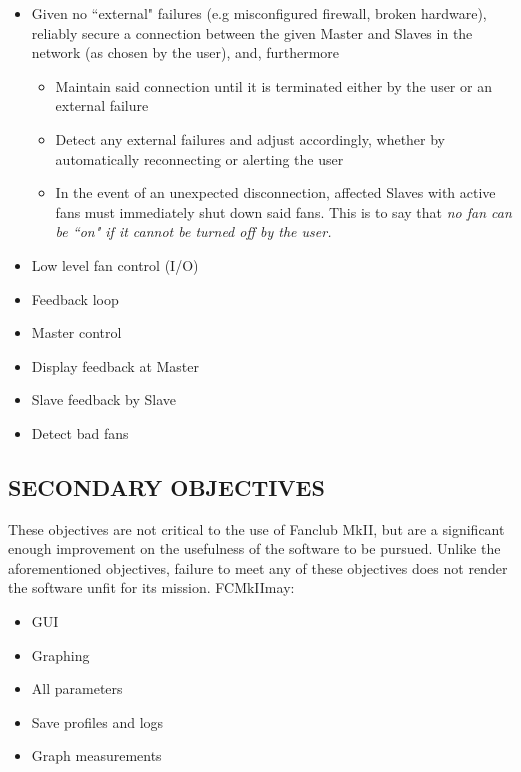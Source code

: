 \documentclass{article}
\newcommand{\fc}{FCMkII}
\newcommand{\Fc}{Fanclub MkII}
\begin{document}
\begin{itemize}
	\item Given no ``external" failures (e.g misconfigured firewall, broken hardware), reliably secure a connection between the given Master and Slaves in the network (as chosen by the user), and, furthermore
	\begin{itemize}
		\item Maintain said connection until it is terminated either by the user or an external failure
		\item Detect any external failures and adjust accordingly, whether by automatically reconnecting or alerting the user
		\item In the event of an unexpected disconnection, affected Slaves with active fans must immediately shut down said fans. This is to say that \emph{no fan can be ``on" if it cannot be turned off by the user.}
	\end{itemize}
	
	\item Low level fan control (I/O)
	
	\item Feedback loop
	
	\item Master control
	
	\item Display feedback at Master
	
	\item Slave feedback by Slave
	
	\item Detect bad fans
	
\end{itemize}

\subsection{SECONDARY OBJECTIVES} %
\label{ssec:SObjs}
These objectives are not critical to the use of \Fc\space, but are a significant enough improvement on the usefulness of the software to be pursued. Unlike the aforementioned objectives, failure to meet any of these objectives does not render the software unfit for its mission. \fc\space may:

\begin{itemize}
	\item GUI
	
	\item Graphing
	
	\item All parameters
	
	\item Save profiles and logs
	
	\item Graph measurements
	
\end{itemize}
\end{document}
